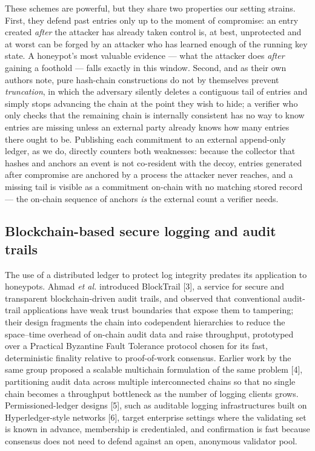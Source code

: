 \documentclass[journal]{IEEEtran}
\begin{document}
These schemes are powerful, but they share two properties our setting strains. First, they defend past entries only up to the moment of compromise: an entry created \emph{after} the attacker has already taken control is, at best, unprotected and at worst can be forged by an attacker who has learned enough of the running key state. A honeypot's most valuable evidence --- what the attacker does \emph{after} gaining a foothold --- falls exactly in this window. Second, and as their own authors note, pure hash-chain constructions do not by themselves prevent \emph{truncation}, in which the adversary silently deletes a contiguous tail of entries and simply stops advancing the chain at the point they wish to hide; a verifier who only checks that the remaining chain is internally consistent has no way to know entries are missing unless an external party already knows how many entries there ought to be. Publishing each commitment to an external append-only ledger, as we do, directly counters both weaknesses: because the collector that hashes and anchors an event is not co-resident with the decoy, entries generated after compromise are anchored by a process the attacker never reaches, and a missing tail is visible as a commitment on-chain with no matching stored record --- the on-chain sequence of anchors \emph{is} the external count a verifier needs.

\subsection{Blockchain-based secure logging and audit trails}

The use of a distributed ledger to protect log integrity predates its application to honeypots. Ahmad \emph{et al.} introduced BlockTrail [3], a service for secure and transparent blockchain-driven audit trails, and observed that conventional audit-trail applications have weak trust boundaries that expose them to tampering; their design fragments the chain into codependent hierarchies to reduce the space--time overhead of on-chain audit data and raise throughput, prototyped over a Practical Byzantine Fault Tolerance protocol chosen for its fast, deterministic finality relative to proof-of-work consensus. Earlier work by the same group proposed a scalable multichain formulation of the same problem [4], partitioning audit data across multiple interconnected chains so that no single chain becomes a throughput bottleneck as the number of logging clients grows. Permissioned-ledger designs [5], such as auditable logging infrastructures built on Hyperledger-style networks [6], target enterprise settings where the validating set is known in advance, membership is credentialed, and confirmation is fast because consensus does not need to defend against an open, anonymous validator pool.
\end{document}
